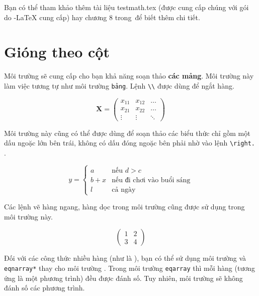 Bạn có thể tham khảo thêm tài liệu testmath.tex (được cung cấp chúng với gói  do \AmS-\LaTeX{} cung cấp) hay chương 8 trong~\companion để biết thêm chi tiết.

\section{Gióng theo cột}\label{sec:vert}
Môi trường  sẽ cung cấp cho bạn khả năng soạn thảo \textbf{các mảng}. Môi trường này làm việc tương tự như môi trường \texttt{bảng}. Lệnh \verb|\\| được dùng để ngắt hàng.

\begin{example}
\begin{displaymath}
\mathbf{X} =
\left( \begin{array}{ccc}
x_{11} & x_{12} & \ldots \\
x_{21} & x_{22} & \ldots \\
\vdots & \vdots & \ddots
\end{array} \right)
\end{displaymath}
\end{example}

Môi trường này cũng có thể được dùng để soạn thảo các biểu thức chỉ gồm một dấu ngoặc lớn bên trái, không có dấu đóng ngoặc bên phải nhờ vào lệnh \verb|\right.| .

\begin{example}
\begin{displaymath}
y = \left\{ \begin{array}{ll}
 a & \textrm{nếu $d>c$}\\
 b+x & \textrm{nếu đi chơi vào
  buổi sáng}\\
 l & \textrm{cả ngày}
  \end{array} \right.
\end{displaymath}
\end{example}

Các lệnh vẽ hàng ngang, hàng dọc trong môi trường  cũng được sử dụng trong môi trường này.
\begin{example}
\begin{displaymath}
\left(\begin{array}{c|c}
 1 & 2 \\
\hline
3 & 4
\end{array}\right)
\end{displaymath}
\end{example}

Đối với các công thức nhiều hàng (như là ), bạn có thể sử dụng môi trường  và \verb|eqnarray*| thay cho môi trường . Trong môi trường \texttt{eqarray} thì mỗi hàng (tương ứng là một phương trình) đều được đánh số. Tuy nhiên, môi trường  sẽ không đánh số các phương trình.

